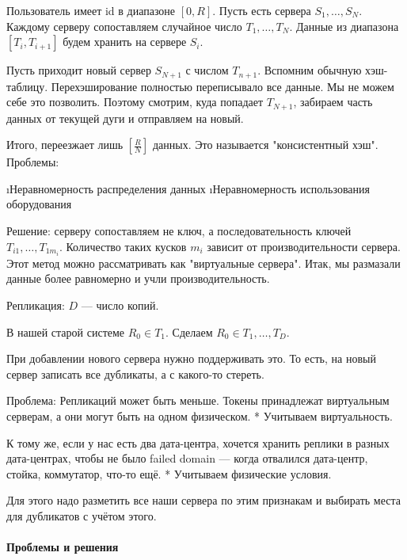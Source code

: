 Пользователь имеет id в диапазоне $[0, R]$. Пусть есть сервера $S_1, \dots, S_N$. Каждому серверу сопоставляем случайное число $T_1, \dots, T_N$.
Данные из диапазона $[T_i, T_{i+1}]$ будем хранить на сервере $S_i$.

Пусть приходит новый сервер $S_{N+1}$ с числом $T_{n+1}$. Вспомним обычную хэш-таблицу. Перехэширование полностью переписывало все данные. Мы не можем себе это позволить. Поэтому смотрим, куда попадает $T_{N+1}$, забираем часть данных от текущей дуги и отправляем на новый.


Итого, переезжает лишь $[\frac{R}{N}]$ данных.
Это называется "консистентный хэш".
Проблемы: 
\begin{enumerate}
\i Неравномерность распределения данных
\i Неравномерность использования оборудования
\end{enumerate}

Решение: серверу сопоставляем не ключ, а последовательность ключей $T_{i1}, \dots, T_{1m_i}$. Количество таких кусков $m_i$ зависит от производительности сервера. Этот метод можно рассматривать как "виртуальные сервера". Итак, мы размазали данные более равномерно и учли производительность.

Репликация:
$D$ --- число копий.

В нашей старой системе $R_0 \in T_1$.
Сделаем $R_0 \in T_1, \dots, T_D$.

При добавлении нового сервера нужно поддерживать это. То есть, на новый сервер записать все дубликаты, а с какого-то стереть.

Проблема:
Репликаций может быть меньше. Токены принадлежат виртуальным серверам, а они могут быть на одном физическом.
* Учитываем виртуальность.

К тому же, если у нас есть два дата-центра, хочется хранить реплики в разных дата-центрах, чтобы не было failed domain --- когда отвалился дата-центр, стойка, коммутатор, что-то ещё. 
* Учитываем физические условия.

Для этого надо разметить все наши сервера по этим признакам и выбирать места для дубликатов с учётом этого.

\paragraph{Проблемы и решения}

